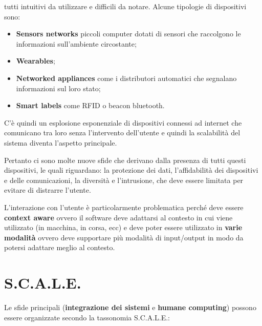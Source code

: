 tutti intuitivi da utilizzare e difficili da notare.
Alcune tipologie di dispositivi sono:

\begin{itemize}
\item \textbf{Sensors networks} piccoli computer dotati di sensori che
  raccolgono le informazioni sull'ambiente circostante;
\item \textbf{Wearables};
\item \textbf{Networked appliances} come i distributori automatici che
  segnalano informazioni sul loro stato;
\item \textbf{Smart labels} come RFID o beacon bluetooth.

\end{itemize}

C'è quindi un esplosione esponenziale di dispositivi connessi ad
internet che comunicano tra loro senza l'intervento dell'utente e
quindi la scalabilità del sistema diventa l'aspetto principale.

Pertanto ci sono molte nuove sfide che derivano dalla presenza di tutti
questi dispositivi, le quali riguardano: la protezione dei dati, l'affidabilità
dei dispositivi e delle comunicazioni, la diversità e l'intrusione, che
deve essere limitata per evitare di distrarre l'utente.

L'interazione con l'utente è particolarmente problematica perché deve
essere \textbf{context aware} ovvero il software deve adattarsi al
contesto in cui viene utilizzato (in macchina, in corsa, ecc) e deve
poter essere utilizzato in \textbf{varie modalità} ovvero deve
supportare più modalità di input/output in modo da potersi adattare
meglio al contesto.

\section{S.C.A.L.E.}
\label{s.c.a.l.e.}

Le sfide principali (\textbf{integrazione dei sistemi} e \textbf{humane
computing}) possono essere organizzate secondo la tassonomia S.C.A.L.E.:

